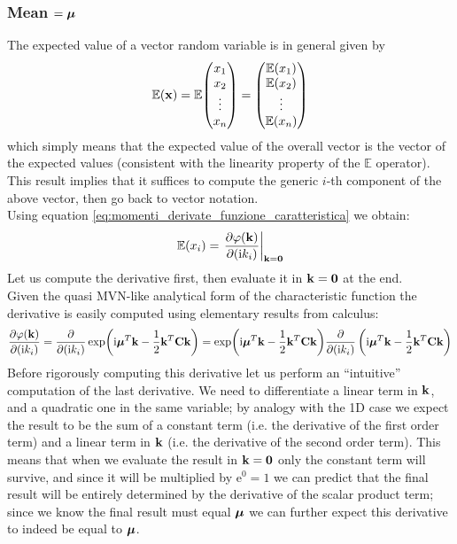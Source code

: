 \documentclass[a4paper]{article}
\newcommand{\mat}[1]{\vb{#1}}
\newcommand{\e}[1]{\mathrm{e}^{#1}}
\let\temp\phi%
\let\phi\varphi
\let\varphi\temp
\renewcommand{\i}{\mathrm{i}} %
\begin{document}
\subsubsection{Mean $=\vb*{\mu}$}
The expected value of a vector random variable is in general given by
\begin{equation*}
    \mathbb{E}(\vb{x}) = \mathbb{E}\mqty(x_1\\x_2\\ \vdots\\ x_n)=\mqty(\mathbb{E}(x_1)\\ \mathbb{E}(x_2)\\ \vdots\\ \mathbb{E}(x_n))
\end{equation*}
which simply means that the expected value of the overall vector is the vector of the expected values (consistent with the linearity property of the $\mathbb{E}$ operator).\\
This result implies that it suffices to compute the generic $i$-th component of the above vector, then go back to vector notation.\\
Using equation \eqref{eq:momenti_derivate_funzione_caratteristica} we obtain:
\begin{equation*}
    \mathbb{E}(x_i) = \eval{\pdv{\phi (\vb{k})}{(\i k_i)}}_{\vb{k} = \vb{0}}
\end{equation*}
Let us compute the derivative first, then evaluate it in $\vb{k} = \vb{0}$ at the end.\\
Given the quasi MVN-like analytical form of the characteristic function the derivative is easily computed using elementary results from calculus:
\begin{equation*}
    \pdv{\phi (\vb{k})}{(\i k_i)} = 
    \pdv{(\i k_i)}\exp(\i \vb*{\mu}^T\vb{k}-\frac{1}{2}\vb{k}^T\mat{C}\vb{k})=\exp(\i \vb*{\mu}^T\vb{k}-\frac{1}{2}\vb{k}^T\mat{C}\vb{k})\pdv{(\i k_i)}\left(\i \vb*{\mu}^T\vb{k}-\frac{1}{2}\vb{k}^T\mat{C}\vb{k}\right)
\end{equation*}
Before rigorously computing this derivative let us perform an ``intuitive'' computation of the last derivative. We need to differentiate a linear term in $\vb{k}$, and a quadratic one in the same variable; by analogy with the 1D case we expect the result to be the sum of a constant term (i.e. the derivative of the first order term) and a linear term in $\vb{k}$ (i.e. the derivative of the second order term). This means that when we evaluate the result in $\vb{k} = \vb{0}$ only the constant term will survive, and since it will be multiplied by $\e{0}=1$ we can predict that the final result will be entirely determined by the derivative of the scalar product term; since we know the final result must equal $\vb*{\mu}$ we can further expect this derivative to indeed be equal to $\vb*{\mu}$.\\
\end{document}
